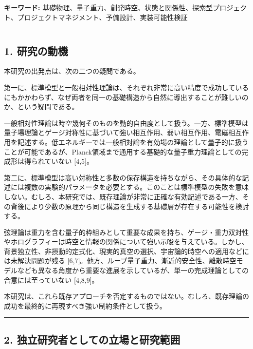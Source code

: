 \documentclass[
  a4paper,
]{ltjsarticle}
\begin{document}
\textbf{キーワード:}
基礎物理、量子重力、創発時空、状態と関係性、探索型プロジェクト、プロジェクトマネジメント、予備設計、実装可能性検証

\begin{center}\rule{0.5\linewidth}{0.5pt}\end{center}

\subsection{1. 研究の動機}\label{ux7814ux7a76ux306eux52d5ux6a5f}

本研究の出発点は、次の二つの疑問である。

第一に、標準模型と一般相対性理論は、それぞれ非常に高い精度で成功しているにもかかわらず、なぜ両者を同一の基礎構造から自然に導出することが難しいのか、という疑問である。

一般相対性理論は時空幾何そのものを動的自由度として扱う。一方、標準模型は量子場理論とゲージ対称性に基づいて強い相互作用、弱い相互作用、電磁相互作用を記述する。低エネルギーでは一般相対論を有効場の理論として量子的に扱うことが可能であるが、Planck領域まで通用する基礎的な量子重力理論としての完成形は得られていない
{[}4,5{]}。

第二に、標準模型は高い対称性と多数の保存構造を持ちながら、その具体的な記述には複数の実験的パラメータを必要とする。このことは標準模型の失敗を意味しない。むしろ、本研究では、既存理論が非常に正確な有効記述である一方、その背後により少数の原理から同じ構造を生成する基礎層が存在する可能性を検討する。

弦理論は重力を含む量子的枠組みとして重要な成果を持ち、ゲージ・重力双対性やホログラフィーは時空と情報の関係について強い示唆を与えている。しかし、背景独立性、非摂動的定式化、現実的真空の選択、宇宙論的時空への適用などには未解決問題が残る
{[}6,7{]}。他方、ループ量子重力、漸近的安全性、離散時空モデルなども異なる角度から重要な進展を示しているが、単一の完成理論としての合意には至っていない
{[}4,8,9{]}。

本研究は、これら既存アプローチを否定するものではない。むしろ、既存理論の成功を最終的に再現すべき強い制約条件として扱う。

\begin{center}\rule{0.5\linewidth}{0.5pt}\end{center}

\subsection{2.
独立研究者としての立場と研究範囲}\label{ux72ecux7acbux7814ux7a76ux8005ux3068ux3057ux3066ux306eux7acbux5834ux3068ux7814ux7a76ux7bc4ux56f2}
\end{document}
